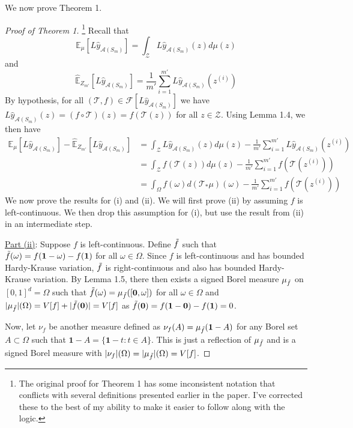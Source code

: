 \documentclass{article}
\begin{document}
We now prove Theorem 1.

\begin{proof}[Proof of Theorem 1]
    {\color{red}\footnote{The original proof for Theorem 1 has some inconsistent notation that conflicts with several definitions presented earlier in the paper. I've corrected these to the best of my ability to make it easier to follow along with the logic.}}
    Recall that 
    \[\mathbb{E}_{\mu}[L \hat{y}_{\mathcal{A}(S_m)}] = \int_{\mathcal{Z}} L \hat{y}_{\mathcal{A}(S_m)} (z) d\mu(z)\] and 
    \[\hat{\mathbb{E}}_{Z_{m'}}[L \hat{y}_{\mathcal{A}(S_m)}] = \frac{1}{m'} \sum_{i=1}^{m'} L \hat{y}_{\mathcal{A}(S_m)} (z^{(i)})\]
    By hypothesis, for all $(\mathcal{T}, f) \in \mathcal{F}[L \hat{y}_{\mathcal{A}(S_m)}]$ we have $L \hat{y}_{\mathcal{A}(S_m)}(z) = (f \circ \mathcal{T})(z) = f(\mathcal{T}(z))$ for all $z \in \mathcal{Z}$. Using Lemma 1.4, we then have
    \begin{align*}
        \mathbb{E}_{\mu}[L \hat{y}_{\mathcal{A}(S_m)}] - \hat{\mathbb{E}}_{Z_{m'}}[L \hat{y}_{\mathcal{A}(S_m)}] & = \int_{\mathcal{Z}} L \hat{y}_{\mathcal{A}(S_m)} (z) d\mu(z) - \frac{1}{m'} \sum_{i=1}^{m'} L \hat{y}_{\mathcal{A}(S_m)} (z^{(i)}) \\
        & = \int_{\mathcal{Z}} f(\mathcal{T}(z)) d\mu(z) - \frac{1}{m'} \sum_{i=1}^{m'} f(\mathcal{T}(z^{(i)})) \\
        & = \int_{\Omega} f(\omega) d(\mathcal{T}_{*}\mu)(\omega) -  \frac{1}{m'} \sum_{i=1}^{m'} f(\mathcal{T}(z^{(i)}))
    \end{align*}
    We now prove the results for (i) and (ii). We will first prove (ii) by assuming $f$ is left-continuous. We then drop this assumption for (i), but use the result from (ii) in an intermediate step.

    \underline{Part (ii)}: Suppose $f$ is left-continuous. Define $\Tilde{f}$ such that $\Tilde{f}(\omega) = f(\mathbf{1} - \omega) - f(\mathbf{1})$ for all $\omega \in \Omega$. Since $f$ is left-continuous and has bounded Hardy-Krause variation, $\Tilde{f}$ is right-continuous and also has bounded Hardy-Krause variation. By Lemma 1.5, there then exists a signed Borel measure $\mu_{\Tilde{f}}$ on $[0, 1]^d = \Omega$ such that $\Tilde{f}(\omega) = \mu_{\Tilde{f}}([\mathbf{0}, \omega])$ for all $\omega \in \Omega$ and $|\mu_{\Tilde{f}}| (\Omega) = V[f] + |\Tilde{f}(\mathbf{0})| = V[f]$ as $\Tilde{f}(\mathbf{0}) = f(\mathbf{1} - \mathbf{0}) - f(\mathbf{1}) = 0$.

    Now, let $\nu_f$ be another measure defined as $\nu_f (A) = \mu_{\Tilde{f}} (\mathbf{1} - A)$ for any Borel set $A \subset \Omega$ such that $\mathbf{1} - A = \{ \mathbf{1} - t: t\in A \}$. This is just a reflection of $\mu_{\Tilde{f}}$ and is a signed Borel measure with $|\nu_f| (\Omega) = |\mu_{\Tilde{f}}| (\Omega) = V[f]$.


\end{proof}
\end{document}
